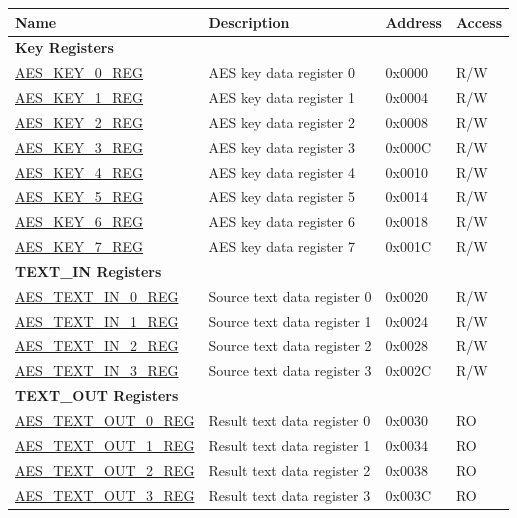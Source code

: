 \begin{longtable}{ | l | l | l | l | }
\hline\rowcolor{lightgray}
\textbf{Name} & \textbf{Description} &  \textbf{Address} & \textbf{Access} \\ \hline
\multicolumn{4}{|l|}{\textbf{Key Registers}} \\ \hline

\hyperref[regdesc:AESKEYnREG]{AES\_KEY\_0\_REG}				&	AES key data register 0				& 0x0000 & R/W \\ \hline
\hyperref[regdesc:AESKEYnREG]{AES\_KEY\_1\_REG}				&	AES key data register 1				& 0x0004 & R/W \\ \hline
\hyperref[regdesc:AESKEYnREG]{AES\_KEY\_2\_REG}				&	AES key data register 2				& 0x0008 & R/W \\ \hline
\hyperref[regdesc:AESKEYnREG]{AES\_KEY\_3\_REG}				&	AES key data register 3				& 0x000C & R/W \\ \hline
\hyperref[regdesc:AESKEYnREG]{AES\_KEY\_4\_REG}				&	AES key data register 4				& 0x0010 & R/W \\ \hline
\hyperref[regdesc:AESKEYnREG]{AES\_KEY\_5\_REG}				&	AES key data register 5				& 0x0014 & R/W \\ \hline
\hyperref[regdesc:AESKEYnREG]{AES\_KEY\_6\_REG}				&	AES key data register 6				& 0x0018 & R/W \\ \hline
\hyperref[regdesc:AESKEYnREG]{AES\_KEY\_7\_REG}				&	AES key data register 7				& 0x001C & R/W \\ \hline

\multicolumn{4}{|l|}{\textbf{TEXT\_IN Registers}} \\ \hline

\hyperref[regdesc:AESTEXTINnREG]{AES\_TEXT\_IN\_0\_REG}			&	Source text data register 0					& 0x0020 & R/W \\ \hline
\hyperref[regdesc:AESTEXTINnREG]{AES\_TEXT\_IN\_1\_REG}			&	Source text data register 1					& 0x0024 & R/W \\ \hline
\hyperref[regdesc:AESTEXTINnREG]{AES\_TEXT\_IN\_2\_REG}			&	Source text data register 2					& 0x0028 & R/W \\ \hline
\hyperref[regdesc:AESTEXTINnREG]{AES\_TEXT\_IN\_3\_REG}			&	Source text data register 3					& 0x002C & R/W \\ \hline

\multicolumn{4}{|l|}{\textbf{TEXT\_OUT Registers}} \\ \hline

\hyperref[regdesc:AESTEXTOUTnREG]{AES\_TEXT\_OUT\_0\_REG}		&	Result text data register 0					& 0x0030 & RO \\ \hline
\hyperref[regdesc:AESTEXTOUTnREG]{AES\_TEXT\_OUT\_1\_REG}		&	Result text data register 1					& 0x0034 & RO \\ \hline
\hyperref[regdesc:AESTEXTOUTnREG]{AES\_TEXT\_OUT\_2\_REG}		&	Result text data register 2					& 0x0038 & RO \\ \hline
\hyperref[regdesc:AESTEXTOUTnREG]{AES\_TEXT\_OUT\_3\_REG}		&	Result text data register 3					& 0x003C & RO \\ \hline


\end{longtable}
